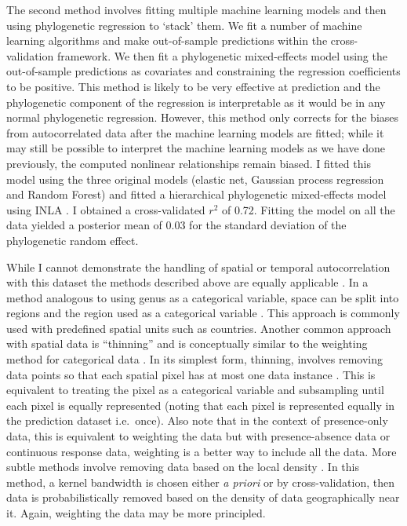 \documentclass[12pt,]{article}
\begin{document}
The second method involves fitting multiple machine learning models and then using phylogenetic regression to `stack' them.
We fit a number of machine learning algorithms and make out-of-sample predictions within the cross-validation framework.
We then fit a phylogenetic mixed-effects model using the out-of-sample predictions as covariates and constraining the regression coefficients to be positive.
This method is likely to be very effective at prediction and the phylogenetic component of the regression is interpretable as it would be in any normal phylogenetic regression.
However, this method only corrects for the biases from autocorrelated data after the machine learning models are fitted; while it may still be possible to interpret the machine learning models as we have done previously, the computed nonlinear relationships remain biased.
I fitted this model using the three original models (elastic net, Gaussian process regression and Random Forest) and fitted a hierarchical phylogenetic mixed-effects model using INLA \citep{INLA}.
I obtained a cross-validated \(r^2\) of 0.72.
Fitting the model on all the data yielded a posterior mean of 0.03 for the standard deviation of the phylogenetic random effect.

While I cannot demonstrate the handling of spatial or temporal autocorrelation with this dataset the methods described above are equally applicable \citep{elith2009species}.
In a method analogous to using genus as a categorical variable, space can be split into regions and the region used as a categorical variable \citep{appelhans2015evaluating}.
This approach is commonly used with predefined spatial units such as countries.
Another common approach with spatial data is ``thinning'' and is conceptually similar to the weighting method for categorical data \citep{elith2010art}.
In its simplest form, thinning, involves removing data points so that each spatial pixel has at most one data instance \citep{elith2010art, verbruggen2013improving}.
This is equivalent to treating the pixel as a categorical variable and subsampling until each pixel is equally represented (noting that each pixel is represented equally in the prediction dataset i.e.~once).
Also note that in the context of presence-only data, this is equivalent to weighting the data but with presence-absence data or continuous response data, weighting is a better way to include all the data.
More subtle methods involve removing data based on the local density \citep{verbruggen2013improving}.
In this method, a kernel bandwidth is chosen either \emph{a priori} or by cross-validation, then data is probabilistically removed based on the density of data geographically near it.
Again, weighting the data may be more principled.
\end{document}
